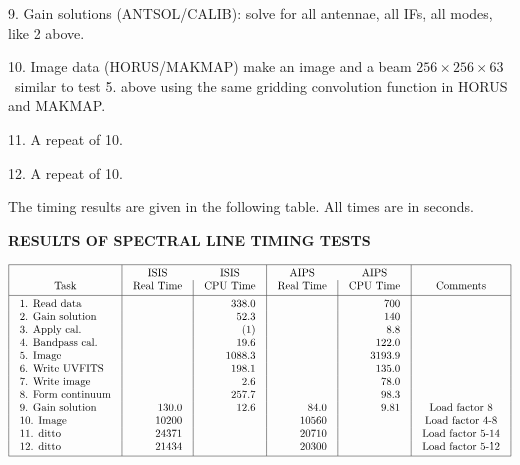 {\item{9.}  Gain solutions (ANTSOL/CALIB): solve for all antennae, all
IFs, all modes, like 2 above.
\item{10.} Image data (HORUS/MAKMAP) make an image and a beam
$256\times 256\times 63$\ similar to test 5. above using the same
gridding convolution function in HORUS and MAKMAP.

\item{11.} A repeat of 10.

\item{12.} A repeat of 10.

   The timing results are given in the following table.  All times are
in seconds.


}
{
\vskip 0.25in
\centerline{\bf RESULTS OF SPECTRAL LINE TIMING TESTS}
\medskip
{
$$\vbox{\offinterlineskip
\hrule
\halign{&\vrule#&\strut\quad\hfil#\quad\cr
height2pt&\omit&&\omit&\omit&\omit&&\omit&\omit&\omit&&\omit&\cr
&\omit&&ISIS\hfil&\omit&ISIS\hfil&&AIPS\hfil&\omit&AIPS\hfil&&\omit&\cr
&Task\hfil&&Real Time\hfil&&CPU Time\hfil&&Real Time\hfil&&
	CPU Time\hfil&&Comments\hfil&\cr
height2pt&\omit&&\omit&&\omit&&\omit&&\omit&&\omit&\cr
\noalign{\hrule}
height2pt&\omit&&\omit&&\omit&&\omit&&\omit&&\omit&\cr
&1. Read data\hfill&&\hfil&&338.0&&\hfil&&700&&\hfil&\cr
&2. Gain solution\hfill&&\hfil&&52.3&&\hfil&&140&&\hfil&\cr
&3. Apply cal.\hfill&&\hfil&&(1)&&\hfil&&8.8&&\omit&\cr
&4. Bandpass cal.\hfill&&\hfil&&19.6&&\hfil&&122.0&&\omit&\cr
&5. Image\hfill&&\hfil&&1088.3&&\hfil&&3193.9&&\omit&\cr
&6. Write UVFITS\hfill&&\hfil&&198.1&&\hfil&&135.0&&\omit&\cr
&7. Write image\hfill&&\hfil&&2.6&&\hfil&&78.0&&\omit&\cr
&8. Form continuum\hfill&&\hfil&&257.7&&\hfil&&98.3&&\omit&\cr
&9. Gain solution\hfill&&130.0&&12.6&&84.0&&9.81&&Load factor 8\hfil&\cr
&10. Image\hfill&&10200&&\hfil&&10560&&\hfil&& Load factor 4-8\hfil&\cr
&11. ditto\hfill&&24371&&\hfil&&20710&&\hfil&& Load factor 5-14\hfil&\cr
&12. ditto\hfill&&21434&&\hfil&&20300&&\hfil&& Load factor 5-12\hfil&\cr
height2pt&\omit&&\omit&&\omit&&\omit&&\omit&&\omit&\cr}
\hrule}$$}}

